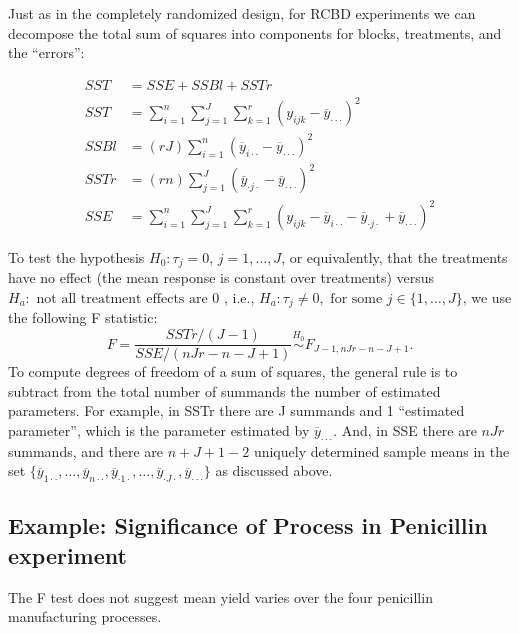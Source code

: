 \documentclass[
]{book}
\begin{document}
Just as in the completely randomized design, for RCBD experiments we can decompose the total sum of squares into components for blocks, treatments, and the ``errors'':

\begin{align*}
SST & = SSE + SSBl + SSTr\\
SST & = \sum_{i=1}^n\sum_{j=1}^J\sum_{k=1}^r (y_{ijk} - \overline y_{\cdot\cdot\cdot})^2\\
SSBl & = (rJ)\sum_{i=1}^n (\overline y_{i\cdot\cdot} - \overline y_{\cdot\cdot\cdot})^2\\
SSTr & = (rn)\sum_{j=1}^J (\overline y_{\cdot j\cdot} - \overline y_{\cdot\cdot\cdot})^2\\
SSE & = \sum_{i=1}^n\sum_{j=1}^J\sum_{k=1}^r (y_{ijk} -\overline y_{i\cdot\cdot}-\overline y_{\cdot j\cdot} + \overline y_{\cdot\cdot\cdot})^2
\end{align*}

To test the hypothesis \(H_0:\tau_j = 0, \,j=1, \ldots, J\), or equivalently, that the treatments have no effect (the mean response is constant over treatments) versus \(H_a:\text{ not all treatment effects are 0 }\), i.e., \(H_a: \tau_j\ne 0, \text{ for some }j\in \{1, \ldots, J\}\), we use the following F statistic:
\[F = \frac{SSTr/(J-1)}{SSE/(nJr - n - J +1)}\stackrel{H_0}{\sim} F_{J-1, nJr - n - J +1}.\]
To compute degrees of freedom of a sum of squares, the general rule is to subtract from the total number of summands the number of estimated parameters. For example, in SSTr there are J summands and 1 ``estimated parameter'', which is the parameter estimated by \(\overline y_{\cdot\cdot\cdot}\). And, in SSE there are \(nJr\) summands, and there are \(n+J+1-2\) uniquely determined sample means in the set \(\{\overline y_{1\cdot\cdot},\ldots, \overline y_{n\cdot\cdot}, \overline y_{\cdot 1\cdot}, \ldots, \overline y_{\cdot J\cdot},\overline y_{\cdot\cdot\cdot}\}\) as discussed above.

\hypertarget{example-significance-of-process-in-penicillin-experiment}{%
\subsection{Example: Significance of Process in Penicillin experiment}\label{example-significance-of-process-in-penicillin-experiment}}

The F test does not suggest mean yield varies over the four penicillin manufacturing processes.
\end{document}
